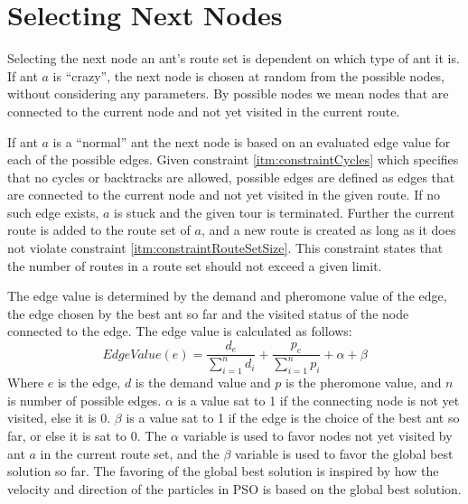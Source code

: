\section{Selecting Next Nodes}

Selecting the next node an ant's route set is dependent on which type of ant it is. If ant $a$ is ``crazy'', the next node is chosen at random from the possible nodes, without considering any parameters. By possible nodes we mean nodes that are connected to the current node and not yet visited in the current route.

If ant $a$ is a ``normal'' ant the next node is based on an evaluated edge value for each of the possible edges. Given constraint \vref{itm:constraintCycles} which specifies that no cycles or backtracks are allowed, possible edges are defined as edges that are connected to the current node and not yet visited in the given route. If no such edge exists, $a$ is stuck and the given tour is terminated. Further the current route is added to the route set of $a$, and a new route is created as long as it does not violate constraint \vref{itm:constraintRouteSetSize}. This constraint states that the number of routes in a route set should not exceed a given limit. 

The edge value is determined by the demand and pheromone value of the edge, the edge chosen by the best ant so far and the visited status of the node connected to the edge. The edge value is calculated as follows: 
\newline
$$EdgeValue(e) = \frac{d_e}{\sum\limits^{n}_{i=1}d_i} + \frac{p_e}{\sum\limits^{n}_{i=1}p_i} + \alpha + \beta$$
\newline
Where $e$ is the edge, $d$ is the demand value and $p$ is the pheromone value, and $n$ is number of possible edges. $\alpha$ is a value sat to 1 if the connecting node is not yet visited, else it is 0. $\beta$ is a value sat to 1 if the edge is the choice of the best ant so far, or else it is sat to 0. The $\alpha$ variable is used to favor nodes not yet visited by ant $a$ in the current route set, and the $\beta$ variable is used to favor the global best solution so far. The favoring of the global best solution is inspired by how the velocity and direction of the particles in PSO is based on the global best solution. 

